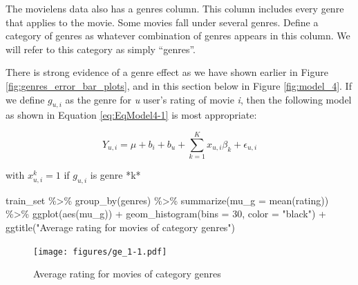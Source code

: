 \documentclass[
]{article}
\newenvironment{Shaded}{}{}
\newcommand{\AttributeTok}[1]{\textcolor[rgb]{0.49,0.56,0.16}{#1}}
\newcommand{\DecValTok}[1]{\textcolor[rgb]{0.25,0.63,0.44}{#1}}
\newcommand{\FunctionTok}[1]{\textcolor[rgb]{0.02,0.16,0.49}{#1}}
\newcommand{\NormalTok}[1]{#1}
\newcommand{\SpecialCharTok}[1]{\textcolor[rgb]{0.25,0.44,0.63}{#1}}
\newcommand{\StringTok}[1]{\textcolor[rgb]{0.25,0.44,0.63}{#1}}
\begin{document}
The movielens data also has a genres column. This column includes every
genre that applies to the movie. Some movies fall under several genres.
Define a category of genres as whatever combination of genres appears in
this column. We will refer to this category as simply ``genres''.

There is strong evidence of a genre effect as we have shown earlier in
Figure \ref{fig:genres_error_bar_plots}, and in this section below in
Figure \ref{fig:model_4}. If we define \(g_{u,i}\) as the genre for
\emph{u} user's rating of movie \emph{i}, then the following model as
shown in Equation \ref{eq:EqModel4-1} is most appropriate:

%
\par

\label{eq:EqModel4-1} \begin{equation}
  Y_{u,i} = \mu + b_{i} + b_{u} + \sum_{k=1}^Kx_{u,i}\beta_k + \epsilon_{u,i}
\end{equation}

\begin{center}
with $x_{u,i}^k=1$ if $g_{u,i}$ is genre *k*
\end{center}

\begin{Shaded}
\begin{Highlighting}[]
\NormalTok{train\_set }\SpecialCharTok{\%\textgreater{}\%} 
  \FunctionTok{group\_by}\NormalTok{(genres) }\SpecialCharTok{\%\textgreater{}\%} 
  \FunctionTok{summarize}\NormalTok{(}\AttributeTok{mu\_g =} \FunctionTok{mean}\NormalTok{(rating)) }\SpecialCharTok{\%\textgreater{}\%} 
  \FunctionTok{ggplot}\NormalTok{(}\FunctionTok{aes}\NormalTok{(mu\_g)) }\SpecialCharTok{+} 
  \FunctionTok{geom\_histogram}\NormalTok{(}\AttributeTok{bins =} \DecValTok{30}\NormalTok{, }\AttributeTok{color =} \StringTok{"black"}\NormalTok{) }\SpecialCharTok{+} 
  \FunctionTok{ggtitle}\NormalTok{(}\StringTok{"Average rating for movies of category genres"}\NormalTok{)}
\end{Highlighting}
\end{Shaded}

\begin{figure}
\centering
\texttt{[image: figures/ge\_1-1.pdf]}
\caption{Average rating for movies of category
genres\label{fig:average_ratings_for_movies_of_category_genres}}
\end{figure}
\end{document}
